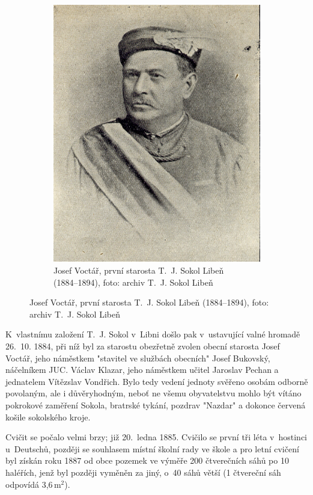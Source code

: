 \documentclass[a5paper, 11pt, twoside]{article}
\begin{document}
\begin{figure}[h]
\begin{subfigure}[c]{0.5\textwidth}
   \includegraphics[width=\textwidth]{img/04_voctar.jpg}
  \caption*{Josef Voctář, první starosta T.~J. Sokol Libeň (1884–⁠⁠⁠⁠⁠⁠1894), foto: archiv T.~J. Sokol Libeň }
  \end{subfigure}
\end{figure}

K~vlastnímu založení T.~J. Sokol v~Libni došlo pak v~ustavující valné hromadě 26.~10. 1884, při níž byl za starostu obezřetně zvolen obecní starosta Josef Voctář, jeho náměstkem "stavitel ve službách obecních" Josef Bukovský, náčelníkem JUC. Václav Klazar, jeho náměstkem učitel Jaroslav Pechan a jednatelem Vítězslav Vondřich. Bylo tedy vedení jednoty svěřeno osobám odborně povolaným, ale i důvěryhodným, neboť ne všemu obyvatelstvu mohlo být vítáno pokrokové zaměření Sokola, bratrské tykání, pozdrav "Nazdar" a dokonce červená košile sokolského kroje.

Cvičit se počalo velmi brzy; již 20.~ledna 1885. Cvičilo se první tři léta v~hostinci u~Deutschů, později se souhlasem místní školní rady ve škole a pro letní cvičení byl získán roku 1887 od obce pozemek ve výměře 200 čtverečních sáhů po 10 haléřích, jenž byl později vyměněn za jiný, o~40 sáhů větší (1 čtvereční sáh odpovídá 3,6\,$\textrm{m}^2$).
\end{document}

